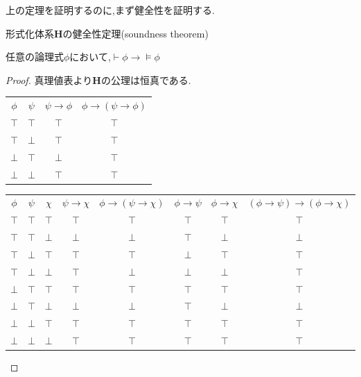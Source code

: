 上の定理を証明するのに,まず健全性を証明する.
\begin{lemma}
 \label{H_soundness}
 形式化体系$\bm{H}$の健全性定理(soundness theorem)

 任意の論理式$\phi$において,$\vdash \phi \to \models \phi$
\end{lemma}
\begin{proof}
 真理値表より$\bm{H}$の公理は恒真である.
\begin{center}
\begin{tabular}{|c c||c||c|}
\hline
$\phi$ & $\psi$ & $\psi \to \phi$ & $\phi \to (\psi \to \phi)$ \\
\hhline{|==#=#=|}
$\top$ & $\top$ & $\top$ & $\top$ \\
\hline
$\top$ & $\bot$ & $\top$ & $\top$ \\
\hline
$\bot$ & $\top$ & $\bot$ & $\top$ \\
\hline
$\bot$ & $\bot$ & $\top$ & $\top$ \\
\hline
\end{tabular}
\end{center}

\begin{center}
\begin{tabular}{|c c c||c|c||c|c||c|}
\hline
$\phi$ & $\psi$ & $\chi$ & $\psi \to \chi$ & $\phi \to (\psi \to \chi)$ & $\phi \to \psi$ & $ \phi \to \chi $ & $ (\phi \to \psi) \to (\phi \to \chi) $ \\
\hhline{|===#=|=#=|=#=|}
$\top$ & $\top$ & $\top$ & $\top$ & $\top$ & $\top$ & $\top$ & $\top$ \\
\hline
$\top$ & $\top$ & $\bot$ & $\bot$ & $\bot$ & $\top$ & $\bot$ & $\bot$ \\
\hline
$\top$ & $\bot$ & $\top$ & $\top$ & $\top$ & $\bot$ & $\top$ & $\top$ \\
\hline
$\top$ & $\bot$ & $\bot$ & $\top$ & $\bot$ & $\bot$ & $\bot$ & $\top$ \\
\hline
$\bot$ & $\top$ & $\top$ & $\top$ & $\top$ & $\top$ & $\top$ & $\top$ \\
\hline
$\bot$ & $\top$ & $\bot$ & $\bot$ & $\bot$ & $\top$ & $\bot$ & $\bot$ \\
\hline
$\bot$ & $\bot$ & $\top$ & $\top$ & $\top$ & $\top$ & $\top$ & $\top$ \\
\hline
$\bot$ & $\bot$ & $\bot$ & $\top$ & $\top$ & $\top$ & $\top$ & $\top$ \\
\hline
\end{tabular}
\end{center}


\end{proof}
